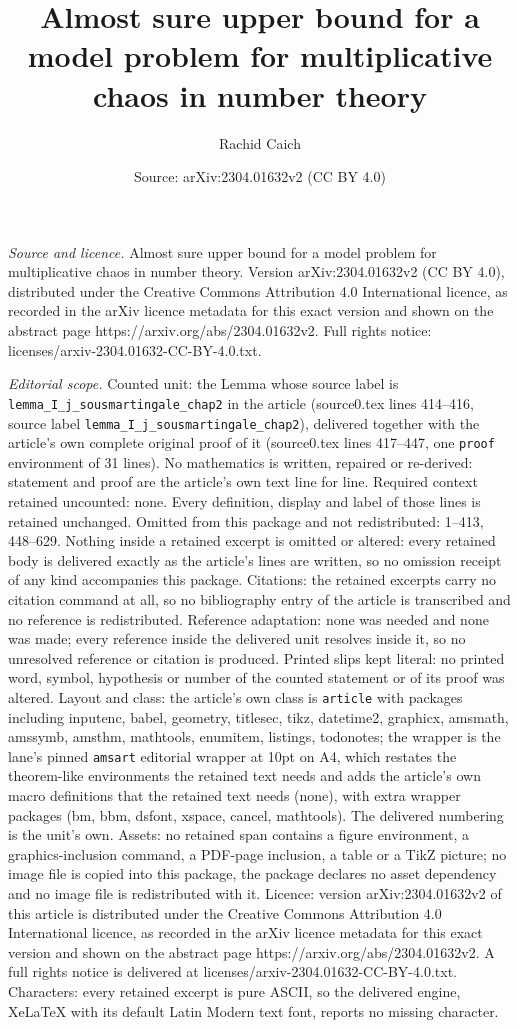 \documentclass[10pt,a4paper]{amsart}
\title[Almost sure upper bound for a model problem for multiplicati]{Almost sure upper bound for a model problem for multiplicative chaos in number theory}
\author{Rachid Caich}
\date{Source: arXiv:2304.01632v2 (CC BY 4.0)}
\begin{document}
\maketitle

\noindent\emph{Source and licence.} Almost sure upper bound for a model problem for multiplicative chaos in number theory. Version arXiv:2304.01632v2 (CC BY 4.0), distributed under the Creative Commons Attribution 4.0 International licence, as recorded in the arXiv licence metadata for this exact version and shown on the abstract page https://arxiv.org/abs/2304.01632v2. Full rights notice: licenses/arxiv-2304.01632-CC-BY-4.0.txt.\par\smallskip

\noindent\textit{Editorial scope.} Counted unit: the Lemma whose source label is \texttt{lemma\_I\_j\_sousmartingale\_chap2} in the article (source0.tex lines 414--416, source label \texttt{lemma\_I\_j\_sousmartingale\_chap2}), delivered together with the article's own complete original proof of it (source0.tex lines 417--447, one \texttt{proof} environment of 31 lines). No mathematics is written, repaired or re-derived: statement and proof are the article's own text line for line. Required context retained uncounted: none. Every definition, display and label of those lines is retained unchanged. Omitted from this package and not redistributed: 1--413, 448--629. Nothing inside a retained excerpt is omitted or altered: every retained body is delivered exactly as the article's lines are written, so no omission receipt of any kind accompanies this package. Citations: the retained excerpts carry no citation command at all, so no bibliography entry of the article is transcribed and no reference is redistributed. Reference adaptation: none was needed and none was made; every reference inside the delivered unit resolves inside it, so no unresolved reference or citation is produced. Printed slips kept literal: no printed word, symbol, hypothesis or number of the counted statement or of its proof was altered. Layout and class: the article's own class is \texttt{article} with packages including inputenc, babel, geometry, titlesec, tikz, datetime2, graphicx, amsmath, amssymb, amsthm, mathtools, enumitem, listings, todonotes; the wrapper is the lane's pinned \texttt{amsart} editorial wrapper at 10pt on A4, which restates the theorem-like environments the retained text needs and adds the article's own macro definitions that the retained text needs (none), with extra wrapper packages (bm, bbm, dsfont, xspace, cancel, mathtools). The delivered numbering is the unit's own. Assets: no retained span contains a figure environment, a graphics-inclusion command, a PDF-page inclusion, a table or a TikZ picture; no image file is copied into this package, the package declares no asset dependency and no image file is redistributed with it. Licence: version arXiv:2304.01632v2 of this article is distributed under the Creative Commons Attribution 4.0 International licence, as recorded in the arXiv licence metadata for this exact version and shown on the abstract page https://arxiv.org/abs/2304.01632v2. A full rights notice is delivered at licenses/arxiv-2304.01632-CC-BY-4.0.txt. Characters: every retained excerpt is pure ASCII, so the delivered engine, XeLaTeX with its default Latin Modern text font, reports no missing character.
\end{document}
